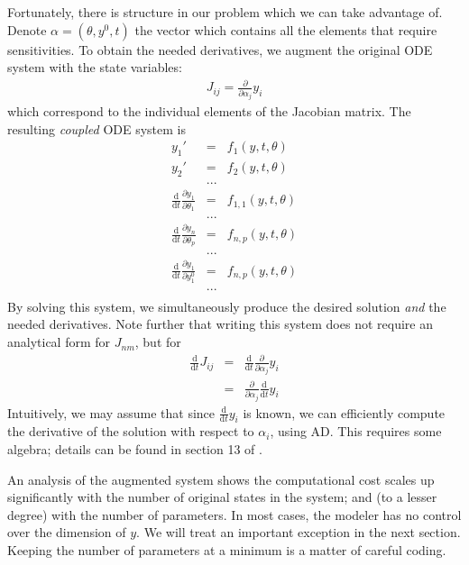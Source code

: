 \documentclass[11pt]{article}
\begin{document}
Fortunately, there is structure in our problem which we can take advantage of.
Denote $\alpha = (\theta, y^0, t)$ the vector which contains all the elements that require sensitivities.
To obtain the needed derivatives, we augment the original ODE system with the state variables:
\begin{eqnarray*}
J_{ij} = \frac{\partial}{\partial \alpha_j}y_i
\end{eqnarray*}
%
which correspond to the individual elements of the Jacobian matrix.
The resulting \textit{coupled} ODE system is
%
  \begin{eqnarray*}
    y_1' & = & f_1(y, t, \theta) \\
    y_2' & = & f_2(y, t, \theta) \\
    & ... & \\
    \frac{\mathrm d}{\mathrm d t} \frac{\partial y_1}{\partial \theta_1} & = & f_{1,1}(y, t, \theta) \\
    & ... &  \\
    \frac{\mathrm d}{\mathrm d t} \frac{\partial y_n}{\partial \theta_p} & = & f_{n, p}(y, t, \theta) \\
    & ... &  \\
    \frac{\mathrm d}{\mathrm d t} \frac{\partial y_1}{\partial y_1^0} & = & f_{n, p}(y, t, \theta)  \\
    & ... & \\
\end{eqnarray*}
%
By solving this system, we simultaneously produce the desired solution \textit{and} the needed derivatives.
Note further that writing this system does not require an analytical form for $J_{nm}$,
but for
%
\begin{eqnarray*}
  \frac{\mathrm d}{\mathrm dt} J_{ij} & = & \frac{\mathrm d}{\mathrm dt}  \frac{\partial}{\partial \alpha_j}y_i \\
     & = &  \frac{\partial}{\partial \alpha_j} \frac{\mathrm d}{\mathrm dt} y_i
\end{eqnarray*}
%
Intuitively, we may assume that since $\frac{\mathrm d}{\mathrm dt} y_i$ is known, we can efficiently compute
the derivative of the solution with respect to $\alpha_i$, using AD.
This requires some algebra; details can be found in section 13 of \cite{Carpenter:2015}.

An analysis of the augmented system shows the computational cost scales up significantly 
with the number of original states in the system; and (to a lesser degree) with the number 
of parameters. In most cases, the modeler has no control over the dimension 
of $y$. We will treat an important exception in the next section. Keeping the number of parameters
 at a minimum is a matter of careful coding.
\end{document}
